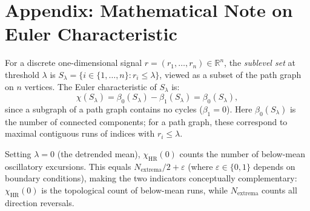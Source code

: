 \documentclass[12pt,a4paper]{article}
\begin{document}
\clearpage
\section*{Appendix: Mathematical Note on Euler Characteristic}
\label{app:math}

For a discrete one-dimensional signal
$r = (r_1, \ldots, r_n) \in \mathbb{R}^n$,
the \emph{sublevel set} at threshold $\lambda$ is
$S_\lambda = \{i \in \{1,\ldots,n\} : r_i \leq \lambda\}$,
viewed as a subset of the path graph on $n$ vertices.
The Euler characteristic of $S_\lambda$ is:
\[
  \chi(S_\lambda)
  = \beta_0(S_\lambda) - \beta_1(S_\lambda)
  = \beta_0(S_\lambda),
\]
since a subgraph of a path graph contains no cycles ($\beta_1 = 0$).
Here $\beta_0(S_\lambda)$ is the number of connected components;
for a path graph, these correspond to maximal contiguous runs of indices
with $r_i \leq \lambda$.

Setting $\lambda = 0$ (the detrended mean), $\chi_{\text{HR}}(0)$ counts
the number of below-mean oscillatory excursions.
This equals $N_{\text{extrema}}/2 + \varepsilon$ (where $\varepsilon \in \{0,1\}$
depends on boundary conditions), making the two indicators conceptually
complementary: $\chi_{\text{HR}}(0)$ is the topological count of
below-mean runs, while $N_{\text{extrema}}$ counts all direction reversals.
\end{document}

